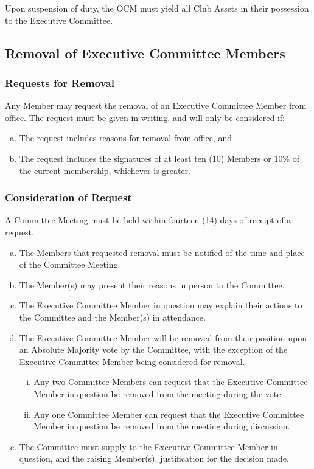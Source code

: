 \documentclass[a4paper,12pt]{article}
\begin{document}
Upon suspension of duty, the OCM must yield all Club Assets in their possession to the Executive Committee.

\subsection{Removal of Executive Committee Members}

\subsubsection{Requests for Removal}

Any Member may request the removal of an Executive Committee Member from office. The request must be given in writing, and will only be considered if:

\begin{enumerate}[a)]
	\item The request includes reasons for removal from office, and
	\item The request includes the signatures of at least ten (10) Members or 10\% of the current membership, whichever is greater.
\end{enumerate}

\subsubsection{Consideration of Request}

A Committee Meeting must be held within fourteen (14) days of receipt of a request.

\begin{enumerate}[a)]
	\item The Members that requested removal must be notified of the time and place of the Committee Meeting.
	\item The Member(s) may present their reasons in person to the Committee.
	\item The Executive Committee Member in question may explain their actions to the Committee and the Member(s) in attendance.
	\item The Executive Committee Member will be removed from their position upon an Absolute Majority vote by the Committee, with the exception of the Executive Committee Member being considered for removal.
	\begin{enumerate}[i)]
		\item Any two Committee Members can request that the Executive Committee Member in question be removed from the meeting during the vote.
		\item Any one Committee Member can request that the Executive Committee Member in question be removed from the meeting during discussion.
	\end{enumerate}
	\item The Committee must supply to the Executive Committee Member in question, and the raising Member(s), justification for the decision made.
\end{enumerate}
\end{document}
